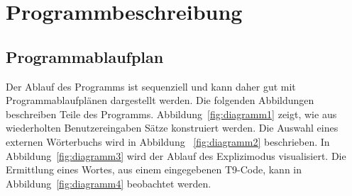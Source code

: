 \chapter{Programmbeschreibung}\label{ch:programmbeschreibung}

\section{Programmablaufplan}\label{sec:pap}
Der Ablauf des Programms ist sequenziell und kann daher gut mit Programmablaufplänen dargestellt werden.
Die folgenden Abbildungen beschreiben Teile des Programms.
Abbildung~\ref{fig:diagramm1} zeigt, wie aus wiederholten Benutzereingaben Sätze konstruiert werden.
Die Auswahl eines externen Wörterbuchs wird in Abbildung ~\ref{fig:diagramm2} beschrieben.
In Abbildung~\ref{fig:diagramm3} wird der Ablauf des Explizimodus visualisiert.
Die Ermittlung eines Wortes, aus einem eingegebenen T9-Code, kann in Abbildung~\ref{fig:diagramm4} beobachtet werden.





